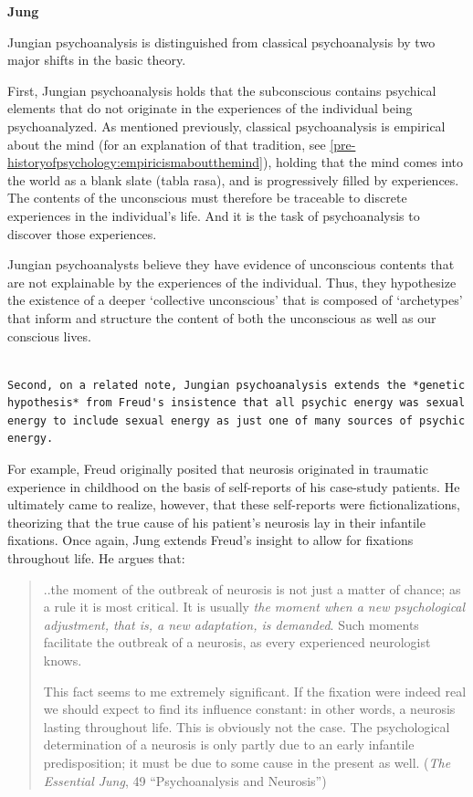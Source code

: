 \textbf{Jung}

Jungian psychoanalysis is distinguished from classical psychoanalysis by two major shifts in the basic theory.

First, Jungian psychoanalysis holds that the subconscious contains psychical elements that do not originate in the experiences of the individual being psychoanalyzed. As mentioned previously, classical psychoanalysis is empirical about the mind (for an explanation of that tradition, see \ref{pre-historyofpsychology:empiricismaboutthemind}), holding that the mind comes into the world as a blank slate (tabla rasa), and is progressively filled by experiences. The contents of the unconscious must therefore be traceable to discrete experiences in the individual's life. And it is the task of psychoanalysis to discover those experiences. 

Jungian psychoanalysts believe they have evidence of unconscious contents that are not explainable by the experiences of the individual. Thus, they hypothesize the existence of a deeper `collective unconscious' that is composed of `archetypes' that inform and structure the content of both the unconscious as well as our conscious lives.

\begin{adjustwidth}{2.5em}{2.5em}
\begin{verbatim}

Second, on a related note, Jungian psychoanalysis extends the *genetic hypothesis* from Freud's insistence that all psychic energy was sexual energy to include sexual energy as just one of many sources of psychic energy.

\end{verbatim}
\end{adjustwidth}

For example, Freud originally posited that neurosis originated in traumatic experience in childhood on the basis of self-reports of his case-study patients. He ultimately came to realize, however, that these self-reports were fictionalizations, theorizing that the true cause of his patient's neurosis lay in their infantile fixations. Once again, Jung extends Freud's insight to allow for fixations throughout life. He argues that:

\begin{quote}

..the moment of the outbreak of neurosis is not just a matter of chance; as a rule it is most critical. It is usually \emph{the moment when a new psychological adjustment, that is, a new adaptation, is demanded}. Such moments facilitate the outbreak of a neurosis, as every experienced neurologist knows.

This fact seems to me extremely significant. If the fixation were indeed real we should expect to find its influence constant: in other words, a neurosis lasting throughout life. This is obviously not the case. The psychological determination of a neurosis is only partly due to an early infantile predisposition; it must be due to some cause in the present as well. (\emph{The Essential Jung}, 49 ``Psychoanalysis and Neurosis'')
\end{quote}

